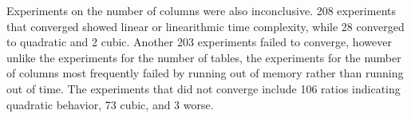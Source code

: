 Experiments on the number of columns were also inconclusive.  208 experiments that converged showed linear or
linearithmic time complexity, while 28 converged to quadratic and 2 cubic.  Another 203 experiments failed to converge,
however unlike the experiments for the number of tables, the experiments for the number of columns most frequently
failed by running out of memory rather than running out of time. The experiments that did not converge include 106
ratios indicating quadratic behavior, 73 cubic, and 3 worse.



